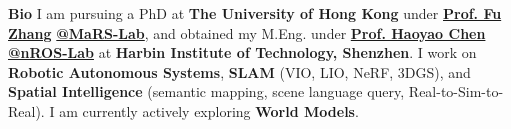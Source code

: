 %
%

\par{
{\textbf{Bio}}
I am pursuing a PhD at \textbf{The University of Hong Kong} under \href{https://mars.hku.hk/}{\textbf{Prof. Fu Zhang}} \href{https://mars.hku.hk/}{\textbf{@MaRS-Lab}}, and obtained my M.Eng. under \href{http://nrs-lab.com//}{\textbf{Prof. Haoyao Chen}} \href{http://nrs-lab.com/}{\textbf{@nROS-Lab}} at \textbf{Harbin Institute of Technology, Shenzhen}.
I work on \textbf{Robotic Autonomous Systems}, \textbf{SLAM} (VIO, LIO, NeRF, 3DGS), and \textbf{Spatial Intelligence} (semantic mapping, scene language query, Real-to-Sim-to-Real).
I am currently actively exploring \textbf{World Models}.
}